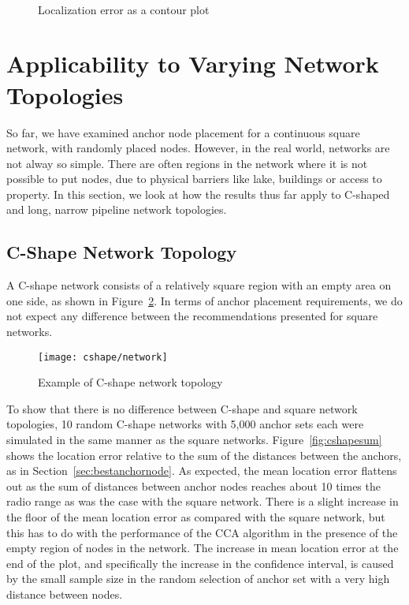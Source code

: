 \begin{figure}
  \centering
	\\
	\caption{Localization error as a contour plot}
	\label{fig:AS6goodcontour}
\end{figure}

\section{Applicability to Varying Network Topologies}

So far, we have examined anchor node placement for a continuous square network, with randomly placed nodes.  However, in the real world, networks are not alway so simple.  There are often regions in the network where it is not possible to put nodes, due to physical barriers like lake, buildings or access to property.  In this section, we look at how the results thus far apply to C-shaped and long, narrow pipeline network topologies.

\subsection{C-Shape Network Topology}

A C-shape network consists of a relatively square region with an empty area on one side, as shown in Figure~\ref{fig:cnetwork}.  In terms of anchor placement requirements, we do not expect any difference between the recommendations presented for square networks.

\begin{figure}
  \centering
	\texttt{[image: cshape/network]}
	\caption{Example of C-shape network topology}
	\label{fig:cnetwork}
\end{figure}

To show that there is no difference between C-shape and square network topologies, 10 random C-shape networks with 5,000 anchor sets each were simulated in the same manner as the square networks.  Figure~\ref{fig:cshapesum} shows the location error relative to the sum of the distances between the anchors, as in Section~\ref{sec:bestanchornode}.  As expected, the mean location error flattens out as the sum of distances between anchor nodes reaches about 10 times the radio range as was the case with the square network.  There is a slight increase in the floor of the mean location error as compared with the square network, but this has to do with the performance of the CCA algorithm in the presence of the empty region of nodes in the network.  The increase in mean location error at the end of the plot, and specifically the increase in the confidence interval, is caused by the small sample size in the random selection of anchor set with a very high distance between nodes.
 
